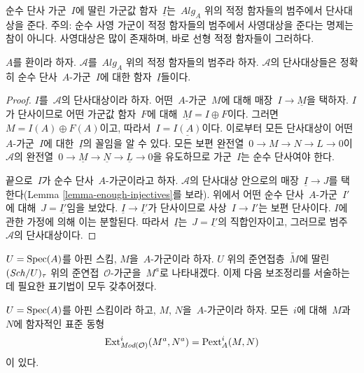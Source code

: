 \noindent
순수 단사 가군\  $I$에 딸린 가군값 함자\  $\underline{I}$는\ 
$\textit{Alg}_A$ 위의 적정 함자들의 범주에서 단사대상을 준다.
주의: 순수 사영 가군이 적정 함자들의 범주에서 사영대상을 준다는
명제는 참이 아니다. 사영대상은 많이 존재하며, 바로 선형 적정
함자들이 그러하다.

\begin{lemma}
\label{lemma-pure-injective-injective-adequate}
$A$를 환이라 하자. $\mathcal{A}$를\  $\textit{Alg}_A$ 위의 적정
함자들의 범주라 하자. $\mathcal{A}$의 단사대상들은 정확히 순수 단사\ 
$A$-가군\  $I$에 대한 함자\  $\underline{I}$들이다.
\end{lemma}

\begin{proof}
$I$를\  $\mathcal{A}$의 단사대상이라 하자. 어떤\  $A$-가군\  $M$에
대해 매장\  $I \to \underline{M}$을 택하자. $I$가 단사이므로 어떤
가군값 함자\  $F$에 대해\  $\underline{M} = I \oplus F$이다. 그러면\ 
$M = I(A) \oplus F(A)$이고, 따라서\  $I = \underline{I(A)}$이다.
이로부터 모든 단사대상이 어떤\  $A$-가군\  $I$에 대한\ 
$\underline{I}$의 꼴임을 알 수 있다. 모든 보편 완전열\ 
$0 \to M \to N \to L \to 0$이\  $\mathcal{A}$의 완전열\ 
$0 \to \underline{M} \to \underline{N} \to \underline{L} \to 0$을
유도하므로 가군\  $I$는 순수 단사여야 한다.

\medskip\noindent
끝으로\  $I$가 순수 단사\  $A$-가군이라고 하자. $\mathcal{A}$의
단사대상 안으로의 매장\  $\underline{I} \to J$를 택한다(Lemma
\ref{lemma-enough-injectives}를 보라). 위에서 어떤 순수 단사\ 
$A$-가군\  $I'$에 대해\  $J = \underline{I'}$임을 보았다.
$\underline{I} \to \underline{I'}$가 단사이므로 사상\ 
$I \to I'$는 보편 단사이다. $I$에 관한 가정에 의해 이는 분할된다.
따라서\  $\underline{I}$는\  $J = \underline{I'}$의 직합인자이고,
그러므로 범주\  $\mathcal{A}$의 단사대상이다.
\end{proof}

\noindent
$U = \mathop{\mathrm{Spec}}(A)$를 아핀 스킴, $M$을\  $A$-가군이라 하자. $U$ 위의
준연접층\  $\widetilde{M}$에 딸린\  $(\mathit{Sch}/U)_\tau$ 위의 준연접\ 
$\mathcal{O}$-가군을\  $M^a$로 나타내겠다. 이제 다음 보조정리를
서술하는 데 필요한 표기법이 모두 갖추어졌다.

\begin{lemma}
\label{lemma-big-ext}
$U = \mathop{\mathrm{Spec}}(A)$를 아핀 스킴이라 하고, $M$, $N$을\  $A$-가군이라 하자.
모든\  $i$에 대해\  $M$과\  $N$에 함자적인 표준 동형
$$
\mathop{\mathrm{Ext}}\nolimits^i_{\textit{Mod}(\mathcal{O})}(M^a, N^a) = \text{Pext}^i_A(M, N)
$$
이 있다.
\end{lemma}

